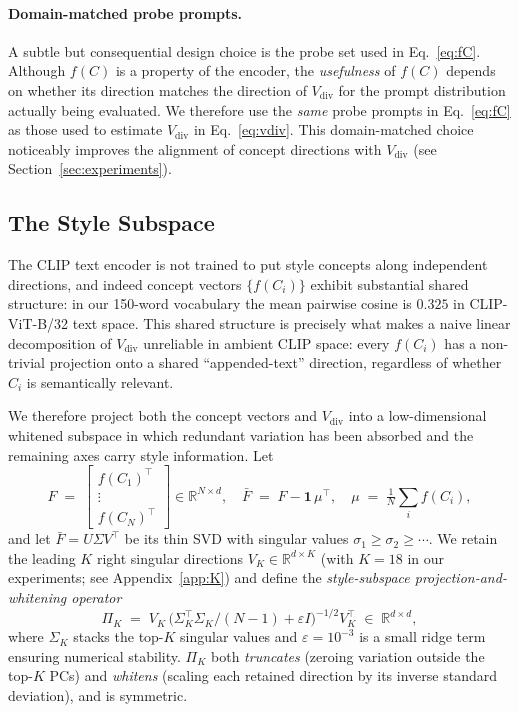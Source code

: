\paragraph{Domain-matched probe prompts.}
A subtle but consequential design choice is the probe set used in
Eq.~\eqref{eq:fC}. Although $f(C)$ is a property of the encoder, the
\emph{usefulness} of $f(C)$ depends on whether its direction matches the
direction of $V_{\mathrm{div}}$ for the prompt distribution actually being
evaluated. We therefore use the \emph{same} probe prompts in
Eq.~\eqref{eq:fC} as those used to estimate $V_{\mathrm{div}}$ in
Eq.~\eqref{eq:vdiv}. This domain-matched choice noticeably improves the
alignment of concept directions with $V_{\mathrm{div}}$ (see
Section~\ref{sec:experiments}).

\subsection{The Style Subspace}
\label{sec:subspace}

The CLIP text encoder is not trained to put style concepts along independent
directions, and indeed concept vectors $\{f(C_i)\}$ exhibit substantial
shared structure: in our 150-word vocabulary the mean pairwise cosine is
$0.325$ in CLIP-ViT-B/32 text space. This shared structure is precisely what
makes a naive linear decomposition of $V_{\mathrm{div}}$ unreliable in
ambient CLIP space: every $f(C_i)$ has a non-trivial projection onto a
shared ``appended-text'' direction, regardless of whether $C_i$ is
semantically relevant.

We therefore project both the concept vectors and $V_{\mathrm{div}}$ into a
low-dimensional whitened subspace in which redundant variation has been
absorbed and the remaining axes carry style information. Let
\begin{equation}
F \;=\; \begin{bmatrix} f(C_1)^\top \\ \vdots \\ f(C_N)^\top \end{bmatrix}
\in\mathbb{R}^{N\times d},
\quad
\bar{F} \;=\; F - \mathbf{1}\,\mu^\top,
\quad
\mu \;=\; \tfrac{1}{N}\textstyle\sum_i f(C_i),
\end{equation}
and let $\bar{F} = U\Sigma V^\top$ be its thin SVD with singular values
$\sigma_1 \ge \sigma_2 \ge \cdots$. We retain the leading $K$ right
singular directions
$V_K \in \mathbb{R}^{d\times K}$ (with $K{=}18$ in our experiments;
see Appendix~\ref{app:K}) and define the \emph{style-subspace
projection-and-whitening operator}
\begin{equation}
\label{eq:Wpca}
\Pi_K \;=\;
V_K \,
\bigl(\Sigma_K^\top \Sigma_K / (N-1) + \varepsilon I\bigr)^{-1/2}
V_K^\top
\;\in\; \mathbb{R}^{d\times d},
\end{equation}
where $\Sigma_K$ stacks the top-$K$ singular values and
$\varepsilon{=}10^{-3}$ is a small ridge term ensuring numerical stability.
$\Pi_K$ both \emph{truncates} (zeroing variation outside the top-$K$ PCs) and
\emph{whitens} (scaling each retained direction by its inverse standard
deviation), and is symmetric.

